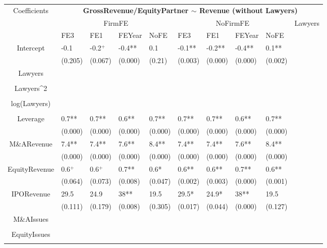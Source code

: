 \documentclass{article}
\begin{document}
\begin{table}[H]
\centering
\begin{tabular}{|clllllllll|}
\hline
\multirow{3}{*}{Coefficients} & \multicolumn{9}{c|}{\textbf{GrossRevenue/EquityPartner $\sim$ Revenue (without Lawyers)}} \\
\cline{2-10}
& \multicolumn{4}{c}{FirmFE} & \multicolumn{4}{c}{NoFirmFE} & \multirow{2}{*}{Lawyers} \\
\cline{2-9}
& FE3 & FE1 & FEYear & NoFE & FE3 & FE1 & FEYear & NoFE &  \\
\hline
 
Intercept & -0.1 & -0.2$^{+}$ & -0.4** & 0.1 & -0.1** & -0.2** & -0.4** & 0.1** & \\ 
   & (0.205) & (0.067) & (0.000) & (0.21) & (0.003) & (0.000) & (0.000) & (0.002) & \\ 
  Lawyers &  &  &  &  &  &  &  &  & \\ 
   &  &  &  &  &  &  &  &  & \\ 
  Lawyers^2 &  &  &  &  &  &  &  &  & \\ 
   &  &  &  &  &  &  &  &  & \\ 
  log(Lawyers) &  &  &  &  &  &  &  &  & \\ 
   &  &  &  &  &  &  &  &  & \\ 
  Leverage & 0.7** & 0.7** & 0.6** & 0.7** & 0.7** & 0.7** & 0.6** & 0.7** & \\ 
   & (0.000) & (0.000) & (0.000) & (0.000) & (0.000) & (0.000) & (0.000) & (0.000) & \\ 
  M\&ARevenue & 7.4** & 7.4** & 7.6** & 8.4** & 7.4** & 7.4** & 7.6** & 8.4** & \\ 
   & (0.000) & (0.000) & (0.000) & (0.000) & (0.000) & (0.000) & (0.000) & (0.000) & \\ 
  EquityRevenue & 0.6$^{+}$ & 0.6$^{+}$ & 0.7** & 0.6* & 0.6** & 0.6** & 0.7** & 0.6** & \\ 
   & (0.064) & (0.073) & (0.008) & (0.047) & (0.002) & (0.003) & (0.000) & (0.001) & \\ 
  IPORevenue & 29.5 & 24.9 & 38** & 19.5 & 29.5* & 24.9* & 38** & 19.5 & \\ 
   & (0.111) & (0.179) & (0.008) & (0.305) & (0.017) & (0.044) & (0.000) & (0.127) & \\ 
  M\&AIssues &  &  &  &  &  &  &  &  & \\ 
   &  &  &  &  &  &  &  &  & \\ 
  EquityIssues &  &  &  &  &  &  &  &  & \\ 
   &  &  &  &  &  &  &  &  & \\ 

\end{tabular}
\end{table}
\end{document}
